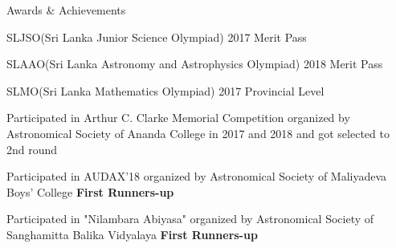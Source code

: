 \begin{rubric}{Awards \& Achievements}

    \par SLJSO(Sri Lanka Junior Science Olympiad) 2017 Merit Pass
    \par SLAAO(Sri Lanka Astronomy and Astrophysics Olympiad) 2018 Merit Pass
    \par SLMO(Sri Lanka Mathematics Olympiad) 2017 Provincial Level
    \par Participated in Arthur C. Clarke Memorial Competition organized by Astronomical Society of Ananda College in 2017 and 2018 and got selected to 2nd round
    \par Participated in AUDAX'18 organized by Astronomical Society of Maliyadeva Boys' College \textbf{First Runners-up}
    \par Participated in "Nilambara Abiyasa" organized by Astronomical Society of Sanghamitta Balika Vidyalaya \textbf{First Runners-up}


\end{rubric}